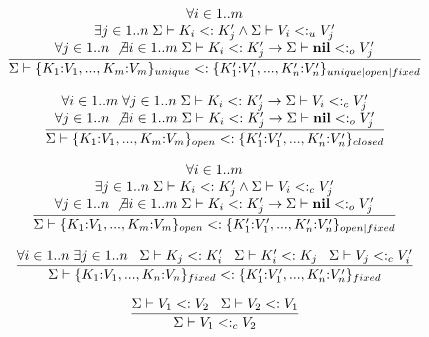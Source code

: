 \[
\dfrac{\begin{array}{c}
       \forall i \in 1..m \\
       \exists j \in 1..n \;
       \Sigma \vdash K_{i} <: K_{j}' \land \Sigma \vdash V_{i} <:_{u} V_{j}' \\
       \forall j \in 1..n \; \not\exists i \in 1..m \;
       \Sigma \vdash K_{i} <: K_{j}' \to \Sigma \vdash \mathbf{nil} <:_{o} V_{j}'
       \end{array}}
      {\Sigma \vdash \{K_{1}{:}V_{1}, ..., K_{m}{:}V_{m}\}_{unique} <:
                    \{K_{1}'{:}V_{1}', ..., K_{n}'{:}V_{n}'\}_{unique|open|fixed}}
\]

\[
\dfrac{\begin{array}{c}
       \forall i \in 1..m \; \forall j \in 1..n \;
       \Sigma \vdash K_{i} <: K_{j}' \to \Sigma \vdash V_{i} <:_{c} V_{j}' \\
       \forall j \in 1..n \; \not\exists i \in 1..m \;
       \Sigma \vdash K_{i} <: K_{j}' \to \Sigma \vdash \mathbf{nil} <:_{o} V_{j}'
       \end{array}}
      {\Sigma \vdash \{K_{1}{:}V_{1}, ..., K_{m}{:}V_{m}\}_{open} <:
                    \{K_{1}'{:}V_{1}', ..., K_{n}'{:}V_{n}'\}_{closed}}
\]

\[
\dfrac{\begin{array}{c}
       \forall i \in 1..m \\
       \exists j \in 1..n \;
       \Sigma \vdash K_{i} <: K_{j}' \land \Sigma \vdash V_{i} <:_{c} V_{j}' \\
       \forall j \in 1..n \; \not\exists i \in 1..m \;
       \Sigma \vdash K_{i} <: K_{j}' \to \Sigma \vdash \mathbf{nil} <:_{o} V_{j}'
       \end{array}}
      {\Sigma \vdash \{K_{1}{:}V_{1}, ..., K_{m}{:}V_{m}\}_{open} <:
                    \{K_{1}'{:}V_{1}', ..., K_{n}'{:}V_{n}'\}_{open|fixed}}
\]

\[
\dfrac{\forall i \in 1..n \; \exists j \in 1..n \;\;\;
       \Sigma \vdash K_{j} <: K_{i}' \;\;\;
       \Sigma \vdash K_{i}' <: K_{j} \;\;\;
       \Sigma \vdash V_{j} <:_{c} V_{i}'}
      {\Sigma \vdash \{K_{1}{:}V_{1}, ..., K_{n}{:}V_{n}\}_{fixed} <:
                    \{K_{1}'{:}V_{1}', ..., K_{n}'{:}V_{n}'\}_{fixed}}
\]

\[
\dfrac{\Sigma \vdash V_{1} <: V_{2} \;\;\;
       \Sigma \vdash V_{2} <: V_{1}}
      {\Sigma \vdash V_{1} <:_{c} V_{2}}
\]

